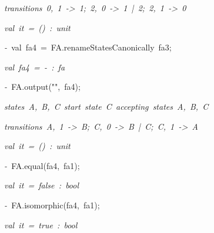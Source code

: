 \begin{list}{}
\item[]\textsl{transitions\ 0,\ 1\ ->\ 1;\ 2,\ 0\ ->\ 1\ |\ 2;\ 2,\ 1\ ->\ 0}
\item[]\textsl{val\ it\ =\ ()\ :\ unit}
\item[]\textsl{-\ }val\ fa4\ =\ FA.renameStatesCanonically\ fa3;
\item[]\textsl{val\ fa4\ =\ -\ :\ fa}
\item[]\textsl{-\ }FA.output("",\ fa4);
\item[]\textsl{states\ A,\ B,\ C\ start\ state\ C\ accepting\ states\ A,\ B,\ C}
\item[]\textsl{transitions\ A,\ 1\ ->\ B;\ C,\ 0\ ->\ B\ |\ C;\ C,\ 1\ ->\ A}
\item[]\textsl{val\ it\ =\ ()\ :\ unit}
\item[]\textsl{-\ }FA.equal(fa4,\ fa1);
\item[]\textsl{val\ it\ =\ false\ :\ bool}
\item[]\textsl{-\ }FA.isomorphic(fa4,\ fa1);
\item[]\textsl{val\ it\ =\ true\ :\ bool}
\end{list}
